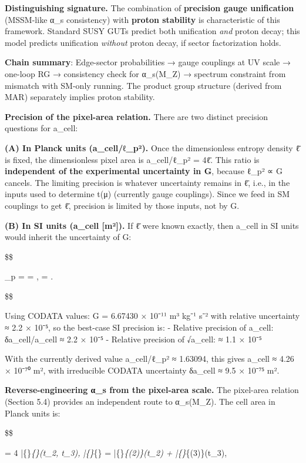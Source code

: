 \documentclass[11pt,a4paper]{article}
\theoremstyle{remark}
\begin{document}
\textbf{Distinguishing signature.} The combination of \textbf{precision gauge
unification} (MSSM-like α\_s consistency) with \textbf{proton stability}
is characteristic of this framework. Standard SUSY GUTs predict both
unification \emph{and} proton decay; this model predicts unification \emph{without}
proton decay, if sector factorization holds.

\textbf{Chain summary}: Edge-sector probabilities → gauge couplings at UV scale
→ one-loop RG → consistency check for α\_s(M\_Z) → spectrum
constraint from mismatch with SM-only running. The product group structure
(derived from MAR) separately implies proton stability.

\textbf{Precision of the pixel-area relation.} There are two distinct precision questions for a\_cell:

\textbf{(A) In Planck units (a\_cell/ℓ\_p²).} Once the dimensionless entropy density ℓ̄ is fixed, the dimensionless pixel area is a\_cell/ℓ\_p² = 4ℓ̄. This ratio is \textbf{independent of the experimental uncertainty in G}, because ℓ\_p² ∝ G cancels. The limiting precision is whatever uncertainty remains in ℓ̄, i.e., in the inputs used to determine t(μ) (currently gauge couplings). Since we feed in SM couplings to get ℓ̄, precision is limited by those inputs, not by G.

\textbf{(B) In SI units (a\_cell {[}m²{]}).} If ℓ̄ were known exactly, then a\_cell in SI units would inherit the uncertainty of G:

\$\$

\ell\_p =  \quad \Rightarrow \quad
{} = , \qquad
{} = .

\$\$

Using CODATA values: G = 6.67430 × 10⁻¹¹ m³ kg⁻¹ s⁻² with relative uncertainty ≈ 2.2 × 10⁻⁵, so the best-case SI precision is:
- Relative precision of a\_cell: δa\_cell/a\_cell ≈ 2.2 × 10⁻⁵
- Relative precision of √a\_cell: ≈ 1.1 × 10⁻⁵

With the currently derived value a\_cell/ℓ\_p² ≈ 1.63094, this gives a\_cell ≈ 4.26 × 10⁻⁷⁰ m², with irreducible CODATA uncertainty δa\_cell ≈ 9.5 × 10⁻⁷⁵ m².

\textbf{Reverse-engineering α\_s from the pixel-area scale.} The pixel-area relation
(Section 5.4) provides an independent route to α\_s(M\_Z). The cell area in
Planck units is:

\$\$

 = 4 \bar\{\ell\}\emph{\{\}(t\_2, t\_3),
\quad
\bar\{\ell\}}\{\} = \bar\{\ell\}\emph{\{(2)\}(t\_2) + \bar\{\ell\}}\{(3)\}(t\_3),
\end{document}
